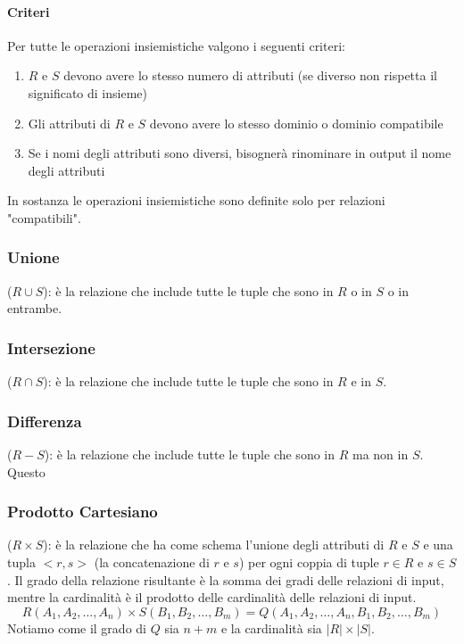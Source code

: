         \paragraph{Criteri} Per tutte le operazioni insiemistiche valgono i seguenti criteri:
            \begin{enumerate}
                \item $ R $ e $ S $ devono avere lo stesso numero di attributi (se diverso non rispetta il significato di insieme)
                \item Gli attributi di $ R $ e $ S $ devono avere lo stesso dominio o dominio compatibile
                \item Se i nomi degli attributi sono diversi, bisognerà rinominare in output il nome degli attributi
            \end{enumerate}
        In sostanza le operazioni insiemistiche sono definite solo per relazioni "compatibili".
        \subsubsection{Unione}($ R\cup S $): è la relazione che include tutte le tuple che sono in $ R $ o in $ S $ o in entrambe.
        \subsubsection{Intersezione}($ R\cap S $): è la relazione che include tutte le tuple che sono in $ R $ e in $ S $.
        \subsubsection{Differenza} ($ R-S $): è la relazione che include tutte le tuple che sono in $ R $ ma non in $ S $. Questo 
        \subsubsection{Prodotto Cartesiano} ($ R \times S $): è la relazione che ha come schema l'unione degli attributi di $ R $ e $ S $ e una tupla $ <r,s> $ (la concatenazione di $ r $ e $ s $) per ogni coppia di tuple $ r \in R $ e $ s \in S $. Il grado della relazione risultante è la somma dei gradi delle relazioni di input, mentre la cardinalità è il prodotto delle cardinalità delle relazioni di input. 
        $$
            R(A_1, A_2, \dots, A_n) \times S(B_1, B_2, \dots, B_m) = Q(A_1, A_2, \dots, A_n, B_1, B_2, \dots, B_m)
        $$
        Notiamo come il grado di $ Q $ sia $ n + m $ e la cardinalità sia $ |R| \times |S| $.
